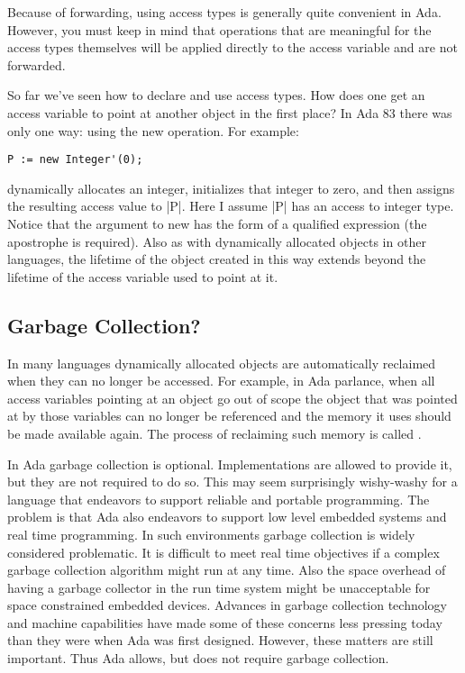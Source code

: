 Because of forwarding, using access types is generally quite convenient in Ada. However, you
must keep in mind that operations that are meaningful for the access types themselves will be
applied directly to the access variable and are not forwarded.

So far we've seen how to declare and use access types. How does one get an access variable to
point at another object in the first place? In Ada 83 there was only one way: using the new
operation. For example:

\begin{lstlisting}
P := new Integer'(0);
\end{lstlisting}

dynamically allocates an integer, initializes that integer to zero, and then assigns the
resulting access value to |P|. Here I assume |P| has an access to integer type. Notice that the
argument to new has the form of a qualified expression (the apostrophe is required). Also as
with dynamically allocated objects in other languages, the lifetime of the object created in
this way extends beyond the lifetime of the access variable used to point at it.

\subsection{Garbage Collection?}

In many languages dynamically allocated objects are automatically reclaimed when they can no
longer be accessed. For example, in Ada parlance, when all access variables pointing at an
object go out of scope the object that was pointed at by those variables can no longer be
referenced and the memory it uses should be made available again. The process of reclaiming such
memory is called .

In Ada garbage collection is optional. Implementations are allowed to provide it, but they are
not required to do so. This may seem surprisingly wishy-washy for a language that endeavors to
support reliable and portable programming. The problem is that Ada also endeavors to support low
level embedded systems and real time programming. In such environments garbage collection is
widely considered problematic. It is difficult to meet real time objectives if a complex garbage
collection algorithm might run at any time. Also the space overhead of having a garbage
collector in the run time system might be unacceptable for space constrained embedded devices.
Advances in garbage collection technology and machine capabilities have made some of these
concerns less pressing today than they were when Ada was first designed. However, these matters
are still important. Thus Ada allows, but does not require garbage collection.


